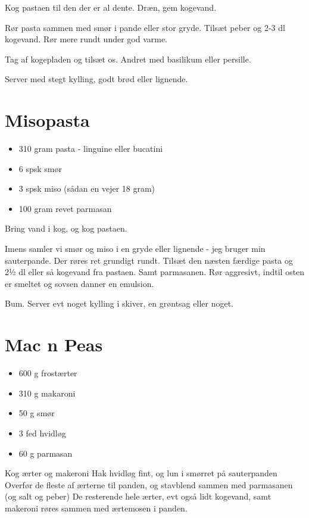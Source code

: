 \documentclass[
]{book}
\providecommand{\tightlist}{%
  \setlength{\itemsep}{0pt}\setlength{\parskip}{0pt}}
\begin{document}
Kog pastaen til den der er al dente. Dræn, gem kogevand.

Rør pasta sammen med smør i pande eller stor gryde. Tilsæt peber og 2-3 dl
kogevand. Rør mere rundt under god varme.

Tag af kogepladen og tilsæt os. Andret med basilikum eller persille.

Server med stegt kylling, godt brød eller lignende.

\hypertarget{misopasta}{%
\section{Misopasta}\label{misopasta}}

\begin{itemize}
\tightlist
\item
  310 gram pasta - linguine eller bucatini
\item
  6 spsk smør
\item
  3 spsk miso (sådan en vejer 18 gram)
\item
  100 gram revet parmasan
\end{itemize}

Bring vand i kog, og kog pastaen.

Imens samler vi smør og miso i en gryde eller lignende - jeg
bruger min sauterpande. Der røres ret grundigt rundt.
Tilsæt den næsten færdige pasta og 2½ dl eller så kogevand
fra pastaen. Samt parmasanen. Rør aggresivt, indtil
osten er smeltet og sovsen danner en emulsion.

Bum. Server evt noget kylling i skiver, en grøntsag eller noget.

\hypertarget{mac-n-peas}{%
\section{Mac n Peas}\label{mac-n-peas}}

\begin{itemize}
\tightlist
\item
  600 g frostærter
\item
  310 g makaroni
\item
  50 g smør
\item
  3 fed hvidløg
\item
  60 g parmasan
\end{itemize}

Kog ærter og makeroni
Hak hvidløg fint, og lun i smørret på sauterpanden
Overfør de fleste af ærterne til panden, og stavblend sammen med parmasanen (og salt og peber)
De resterende hele ærter, evt også lidt kogevand, samt makeroni røres sammen med ærtemosen i panden.
\end{document}
